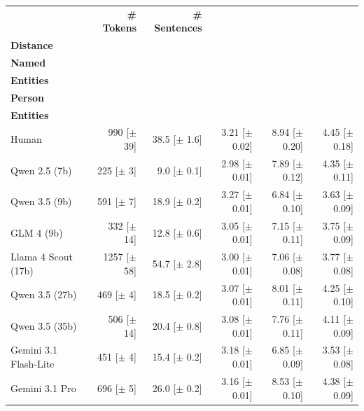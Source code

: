 \documentclass{article} %
\begin{document}
\begin{table}
  \small
  \centering
  \begin{tabular}{lrrrrr}
    \textbf{} & \textbf{\# Tokens} & \textbf{\# Sentences} & \makecell{\textbf{Dependency}\\\textbf{Distance}} & \makecell{\textbf{Avg. \#}\\\textbf{Named}\\\textbf{Entities}} & \makecell{\textbf{Avg. \#}\\\textbf{Person}\\\textbf{Entities}} \\
    \midrule
    Human & 990 [$\pm$ 39] & 38.5 [$\pm$ 1.6] & 3.21 [$\pm$ 0.02] & 8.94 [$\pm$ 0.20] & 4.45 [$\pm$ 0.18] \\
    \midrule
    Qwen 2.5 (7b) & \cellcolor{palered}225 [$\pm$ 3] & \cellcolor{palered}9.0 [$\pm$ 0.1] & \cellcolor{palered}2.98 [$\pm$ 0.01] & \cellcolor{palered}7.89 [$\pm$ 0.12] & \cellcolor{palered}4.35 [$\pm$ 0.11] \\
    Qwen 3.5 (9b) & \cellcolor{palered}591 [$\pm$ 7] & \cellcolor{palered}18.9 [$\pm$ 0.2] & \cellcolor{palegreen}3.27 [$\pm$ 0.01] & \cellcolor{palered}6.84 [$\pm$ 0.10] & \cellcolor{palered}3.63 [$\pm$ 0.09] \\
    GLM 4 (9b) & \cellcolor{palered}332 [$\pm$ 14] & \cellcolor{palered}12.8 [$\pm$ 0.6] & \cellcolor{palered}3.05 [$\pm$ 0.01] & \cellcolor{palered}7.15 [$\pm$ 0.11] & \cellcolor{palered}3.75 [$\pm$ 0.09] \\
    Llama 4 Scout (17b) & \cellcolor{palegreen}1257 [$\pm$ 58] & \cellcolor{palegreen}54.7 [$\pm$ 2.8] & \cellcolor{palered}3.00 [$\pm$ 0.01] & \cellcolor{palered}7.06 [$\pm$ 0.08] & \cellcolor{palered}3.77 [$\pm$ 0.08] \\
    Qwen 3.5 (27b) & \cellcolor{palered}469 [$\pm$ 4] & \cellcolor{palered}18.5 [$\pm$ 0.2] & \cellcolor{palered}3.07 [$\pm$ 0.01] & \cellcolor{palered}8.01 [$\pm$ 0.11] & \cellcolor{palered}4.25 [$\pm$ 0.10] \\
    Qwen 3.5 (35b) & \cellcolor{palered}506 [$\pm$ 14] & \cellcolor{palered}20.4 [$\pm$ 0.8] & \cellcolor{palered}3.08 [$\pm$ 0.01] & \cellcolor{palered}7.76 [$\pm$ 0.11] & \cellcolor{palered}4.11 [$\pm$ 0.09] \\
    Gemini 3.1 Flash-Lite & \cellcolor{palered}451 [$\pm$ 4] & \cellcolor{palered}15.4 [$\pm$ 0.2] & \cellcolor{palered}3.18 [$\pm$ 0.01] & \cellcolor{palered}6.85 [$\pm$ 0.09] & \cellcolor{palered}3.53 [$\pm$ 0.08] \\
    Gemini 3.1 Pro & \cellcolor{palered}696 [$\pm$ 5] & \cellcolor{palered}26.0 [$\pm$ 0.2] & \cellcolor{palered}3.16 [$\pm$ 0.01] & \cellcolor{palered}8.53 [$\pm$ 0.10] & \cellcolor{palered}4.38 [$\pm$ 0.09] \\

\end{tabular}
\end{table}
\end{document}
